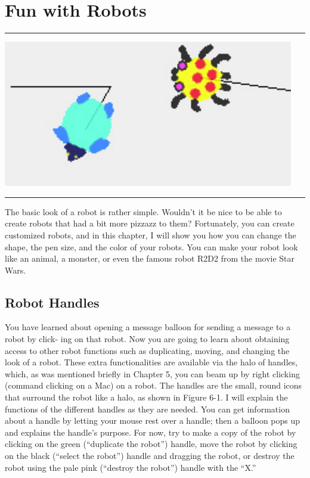 \documentclass[a4paper,10pt,twoside]{book}
\begin{document}
    \sloppy
\fi

\chapter{Fun with Robots}\label{cha:fun}


\noindent\hrule
\begin{center}\includegraphics{beasts}\end{center}
\vspace{0.2cm}
\noindent\hrule\vspace{1.5cm}


The basic look of a robot is rather simple. Wouldn’t it be nice to be able to create robots that 
had a bit more pizzazz to them? Fortunately, you can create customized robots, and in this 
chapter, I will show you how you can change the shape, the pen size, and the color of your 
robots. You can make your robot look like an animal, a monster, or even the famous robot 
R2D2 from the movie Star Wars.


\section{Robot Handles}

You have learned about opening a message balloon for sending a message to a robot by click- 
ing on that robot. Now you are going to learn about obtaining access to other robot functions 
such as duplicating, moving, and changing the look of a robot. These extra functionalities are 
available via the halo of handles, which, as was mentioned briefly in Chapter 5, you can beam 
up by right clicking (command clicking on a Mac) on a robot. The handles are the small, 
round icons that surround the robot like a halo, as shown in Figure 6-1. I will explain the functions
 of the different handles as they are needed. You can get information about a handle by 
letting your mouse rest over a handle; then a balloon pops up and explains the handle’s 
purpose. For now, try to make a copy of the robot by clicking on the green (“duplicate the robot”) 
handle, move the robot by clicking on the black (“select the robot”) handle and dragging the 
robot, or destroy the robot using the pale pink (“destroy the robot”) handle with the “X.” 
\end{document}
